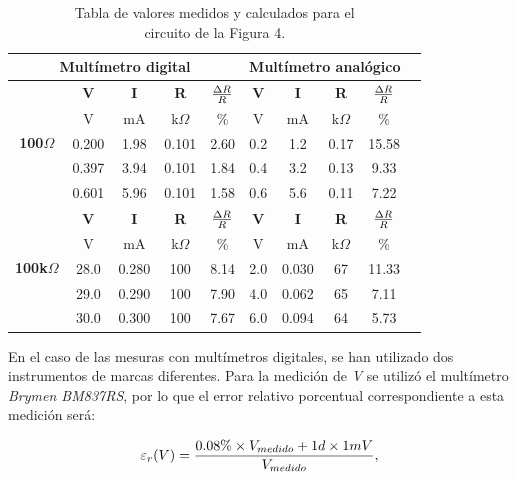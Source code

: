 \documentclass{article}
\begin{document}
\begin{table}[!hbt]
	\begin{center}

		\begin{tabular}{|c|c|c|c|c|c|c|c|c|c|} \hline
			\multicolumn{5}{|c|}{\textbf{Multímetro digital}} & \multicolumn{4}{c|}{\textbf{Multímetro analógico}} \\ \hline
			\multirow{5}{*}{\textbf{100$\Omega$}} 
			& \textbf{V} & \textbf{I} & \textbf{R} & \textbf{${\Delta R \over R}$} & \textbf{V} & \textbf{I} & \textbf{R} & \textbf{${\Delta R \over R}$} \\\cline{2-9}
			& V & mA & k$\Omega$ & \% & V & mA & k$\Omega$ & \% \\\cline{2-9}
			& 0.200 & 1.98 & 0.101 & 2.60 & 0.2 & 1.2 & 0.17 & 15.58 \\\cline{2-9}
			& 0.397 & 3.94 & 0.101 & 1.84 & 0.4 & 3.2 & 0.13 & 9.33 \\\cline{2-9}
			& 0.601 & 5.96 & 0.101 & 1.58 & 0.6 & 5.6 & 0.11 &  7.22 \\ \hline
			\multirow{5}{*}{\textbf{100k$\Omega$}} 
			& \textbf{V} & \textbf{I} & \textbf{R} & \textbf{${\Delta R \over R}$} & \textbf{V} & \textbf{I} & \textbf{R} & \textbf{${\Delta R \over R}$} \\\cline{2-9}
			& V & mA & k$\Omega$ & \% & V & mA & k$\Omega$ & \% \\\cline{2-9}
			& 28.0 & 0.280 & 100 & 8.14 & 2.0 & 0.030 & 67 & 11.33 \\\cline{2-9}
			& 29.0 & 0.290 & 100 & 7.90 & 4.0 & 0.062 & 65 & 7.11 \\\cline{2-9}
			& 30.0 & 0.300 & 100 & 7.67 & 6.0 & 0.094 & 64 & 5.73 \\ \hline
		\end{tabular}

	\caption{Tabla de valores medidos y calculados para el\\ circuito de la Figura 4.}
	\end{center}
\end{table}
\bigskip


	En el caso de las mesuras con multímetros digitales, se han utilizado dos instrumentos de marcas diferentes. Para la medición de \textit{V} se utilizó el multímetro \textit{Brymen BM837RS}, por lo que el error relativo porcentual correspondiente a esta medición será:
\medskip

\begin{equation}
 	\varepsilon_r(V) = {0.08\%\times V_{medido} + 1d\times 1mV \over V_{medido}},
\end{equation}
\medskip
\end{document}
